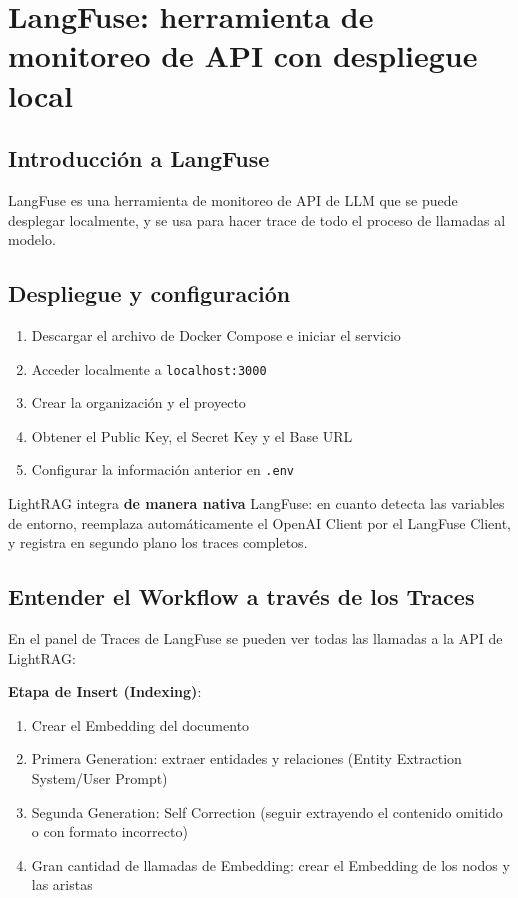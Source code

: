 \section{LangFuse: herramienta de monitoreo de API con despliegue local}

\subsection{Introducción a LangFuse}

LangFuse es una herramienta de monitoreo de API de LLM que se puede desplegar localmente, y se usa para hacer trace de todo el proceso de llamadas al modelo.

\subsection{Despliegue y configuración}

\begin{enumerate}
    \item Descargar el archivo de Docker Compose e iniciar el servicio
    \item Acceder localmente a \texttt{localhost:3000}
    \item Crear la organización y el proyecto
    \item Obtener el Public Key, el Secret Key y el Base URL
    \item Configurar la información anterior en \texttt{.env}
\end{enumerate}

LightRAG integra \textbf{de manera nativa} LangFuse: en cuanto detecta las variables de entorno, reemplaza automáticamente el OpenAI Client por el LangFuse Client, y registra en segundo plano los traces completos.

\subsection{Entender el Workflow a través de los Traces}

En el panel de Traces de LangFuse se pueden ver todas las llamadas a la API de LightRAG:

\textbf{Etapa de Insert (Indexing)}:
\begin{enumerate}
    \item Crear el Embedding del documento
    \item Primera Generation: extraer entidades y relaciones (Entity Extraction System/User Prompt)
    \item Segunda Generation: Self Correction (seguir extrayendo el contenido omitido o con formato incorrecto)
    \item Gran cantidad de llamadas de Embedding: crear el Embedding de los nodos y las aristas
\end{enumerate}

